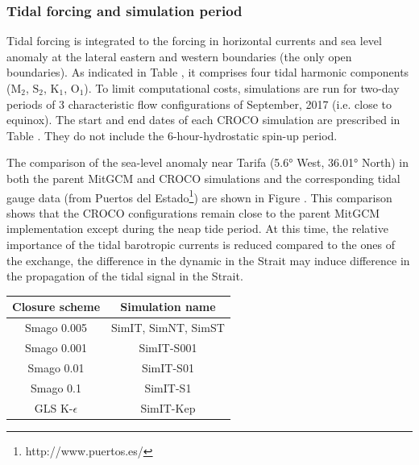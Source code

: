 \subsubsection{Tidal forcing and simulation period}
Tidal forcing is integrated to the forcing \color{red}in horizontal currents and sea level anomaly\color{black} at the lateral eastern and western boundaries (the only open boundaries). As indicated in Table , it comprises four tidal harmonic components ($\text{M}_{\text{2}}$, $\text{S}_{\text{2}}$, $\text{K}_{\text{1}}$, $\text{O}_{\text{1}}$). To limit computational costs, simulations are run for two-day periods of 3 characteristic flow configurations of September, 2017 (i.e. close to equinox). The start and end dates of each CROCO simulation are prescribed in Table . They do not include the 6-hour-hydrostatic spin-up period.

The comparison of the sea-level anomaly near Tarifa (5.6° West, 36.01° North) in both the parent MitGCM and CROCO simulations and the corresponding tidal gauge data (from Puertos del Estado\footnote{http://www.puertos.es/}) are shown in Figure . This comparison shows that the CROCO configurations remain close to the parent MitGCM implementation except during the neap tide period. At this time, the relative importance of the tidal barotropic currents is reduced compared to the ones of the exchange, the difference in the dynamic in the Strait may induce difference in the propagation of the tidal signal in the Strait.

\begin{table}[!h]
        \centering
        \begin{tabular}{|c|c|}
                \hline
                Closure scheme & Simulation name\\
                \hline
                Smago 0.005 & SimIT, SimNT, SimST\\
                Smago 0.001 & SimIT-S001\\
                Smago 0.01 & SimIT-S01\\
                Smago 0.1 & SimIT-S1\\
                GLS K-$\epsilon$ & SimIT-Kep\\
                \hline
        \end{tabular}
        \label{tab_sim3Dnames}
\end{table}


